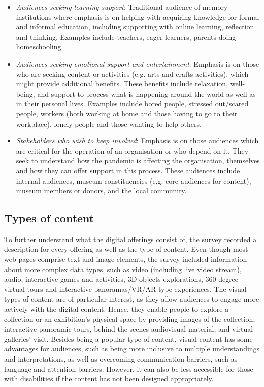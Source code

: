 \documentclass{egpubl}
\begin{document}
\begin{itemize}
	\item \textit{Audiences seeking learning support}: Traditional audience of memory institutions where emphasis is on helping with acquiring knowledge for formal and informal education, including supporting with online learning, reflection and thinking. Examples include teachers, eager learners, parents doing homeschooling.
	\item \textit{Audiences seeking emotional support and entertainment}: Emphasis is on those who are seeking content or activities (e.g. arts and crafts activities), which might provide additional benefits. These benefits include relaxation, well-being, and support to process what is happening around the world as well as in their personal lives. Examples include bored people, stressed out/scared people, workers (both working at home and those having to go to their workplace), lonely people and those wanting to help others. 
	\item \textit{Stakeholders who wish to keep involved}: Emphasis is on those audiences which are critical for the operation of an organisation or who depend on it. They seek to understand how the pandemic is affecting the organisation, themselves and how they can offer support in this process. These audiences include internal audiences, museum constituencies (e.g. core audiences for content), museum members or donors, and the local community.
\end{itemize}


\subsection{Types of content}
\label{typ}
To further understand what the digital offerings consist of, the survey recorded a description for every offering as well as the type of content. Even though most web pages comprise text and image elements, the survey included information about more complex data types, such as video (including live video stream), audio, interactive games and activities, 3D objects explorations, 360-degree virtual tours and interactive panoramas/VR/AR type experiences.
The visual types of content are of particular interest, as they allow audiences to engage more actively with the digital content. Hence, they enable people to explore a collection or an exhibition's physical space by providing images of the collection, interactive panoramic tours, behind the scenes audiovisual material, and virtual galleries' visit. Besides being a popular type of content, visual content has some advantages for audiences, such as being more inclusive to multiple understandings and interpretations, as well as overcoming communication barriers, such as language and attention barriers. However, it can also be less accessible for those with disabilities if the content has not been designed appropriately.
\end{document}
